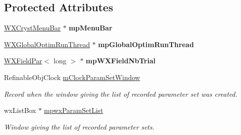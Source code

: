 \subsection*{Protected Attributes}
\begin{DoxyCompactItemize}
\item 
\mbox{\label{class_obj_cryst_1_1_w_x_optimization_obj_a9c134db8f0540b11a084d023498a3e11}} 
\mbox{\hyperlink{class_obj_cryst_1_1_w_x_cryst_menu_bar}{W\+X\+Cryst\+Menu\+Bar}} $\ast$ {\bfseries mp\+Menu\+Bar}
\item 
\mbox{\label{class_obj_cryst_1_1_w_x_optimization_obj_a77948d4f4d727eed7810f70839a2a67b}} 
\mbox{\hyperlink{class_obj_cryst_1_1_w_x_global_optim_run_thread}{W\+X\+Global\+Optim\+Run\+Thread}} $\ast$ {\bfseries mp\+Global\+Optim\+Run\+Thread}
\item 
\mbox{\label{class_obj_cryst_1_1_w_x_optimization_obj_a1d259e14ad80189d3d8f6402de0768dc}} 
\mbox{\hyperlink{class_obj_cryst_1_1_w_x_field_par}{W\+X\+Field\+Par}}$<$ long $>$ $\ast$ {\bfseries mp\+W\+X\+Field\+Nb\+Trial}
\item 
\mbox{\label{class_obj_cryst_1_1_w_x_optimization_obj_ae4a2dd55a8d8e9de1dd5888d2a9c4f72}} 
Refinable\+Obj\+Clock \mbox{\hyperlink{class_obj_cryst_1_1_w_x_optimization_obj_ae4a2dd55a8d8e9de1dd5888d2a9c4f72}{m\+Clock\+Param\+Set\+Window}}
\begin{DoxyCompactList}\small\item\em Record when the window giving the list of recorded parameter set was created. \end{DoxyCompactList}\item 
\mbox{\label{class_obj_cryst_1_1_w_x_optimization_obj_afb4d3681ab182d0d1a064a3794437731}} 
wx\+List\+Box $\ast$ \mbox{\hyperlink{class_obj_cryst_1_1_w_x_optimization_obj_afb4d3681ab182d0d1a064a3794437731}{mpwx\+Param\+Set\+List}}
\begin{DoxyCompactList}\small\item\em Window giving the list of recorded parameter sets. \end{DoxyCompactList}\end{DoxyCompactItemize}


